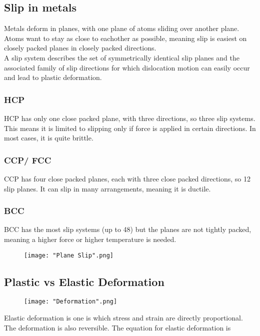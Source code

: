 \documentclass[a4paper, 12pt]{article}
\begin{document}
		\subsection*{Slip in metals}
			Metals deform in planes, with one plane of atoms sliding over another plane.  Atoms want to stay as close to eachother as possible, meaning slip is easiest on closely packed planes in closely packed directions. \\
			A slip system describes the set of symmetrically identical slip planes and the associated family of slip directions for which dislocation motion can easily occur and lead to plastic deformation. 
			\subsubsection*{HCP}
				HCP has only one close packed plane, with three directions, so three slip systems. This means it is limited to slipping only if force is applied in certain directions. In most cases, it is quite brittle. 
			
			\subsubsection*{CCP/ FCC}
				CCP has four close packed planes, each with three close packed directions, so 12 slip planes. It can slip in many arrangements, meaning it is ductile. 
				
			\subsubsection*{BCC}
				BCC has the most slip systems (up to 48) but the planes are not tightly packed, meaning a higher force or higher temperature is needed. 
				\begin{figure}[!h]
					\texttt{[image: "Plane Slip".png]}
				\end{figure}

		\subsection*{Plastic vs Elastic Deformation}
		
			\begin{figure}[!ht]
				\texttt{[image: "Deformation".png]}
			\end{figure}
			
			Elastic deformation is one is which stress and strain are directly proportional. The deformation is also reversible. The equation for elastic deformation is 
			
\end{document}
